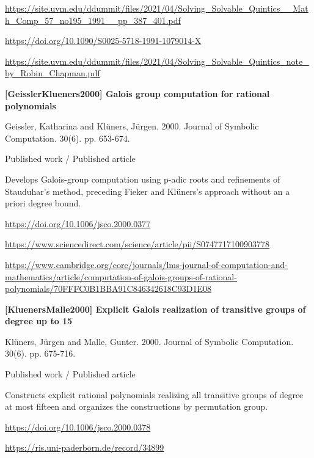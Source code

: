 \documentclass[11pt,a4paper,oneside,openany]{book}
\begin{document}
{\footnotesize\url{https://site.uvm.edu/ddummit/files/2021/04/Solving_Solvable_Quintics__Math_Comp_57_no195_1991__pp_387_401.pdf}}\par
{\footnotesize\url{https://doi.org/10.1090/S0025-5718-1991-1079014-X}}\par
{\footnotesize\url{https://site.uvm.edu/ddummit/files/2021/04/Solving_Solvable_Quintics_note_by_Robin_Chapman.pdf}}\par
\vspace{9pt}
\hypertarget{ref:GeisslerKlueners2000}{}
{\sffamily\bfseries\color{atlasgreen}[GeisslerKlueners2000] Galois group computation for rational polynomials}\par
\color{black} Geissler, Katharina and Klüners, Jürgen. 2000. Journal of Symbolic Computation. 30(6). pp. 653-674.\par
{\small\sffamily\color{atlasgold}Published work / Published article}\par
\color{black} Develops Galois-group computation using p-adic roots and refinements of Stauduhar's method, preceding Fieker and Klüners's approach without an a priori degree bound.\par
{\footnotesize\url{https://doi.org/10.1006/jsco.2000.0377}}\par
{\footnotesize\url{https://www.sciencedirect.com/science/article/pii/S0747717100903778}}\par
{\footnotesize\url{https://www.cambridge.org/core/journals/lms-journal-of-computation-and-mathematics/article/computation-of-galois-groups-of-rational-polynomials/70FFFC0B1BBA91C846342618C93D1E08}}\par
\vspace{9pt}
\hypertarget{ref:KluenersMalle2000}{}
{\sffamily\bfseries\color{atlasgreen}[KluenersMalle2000] Explicit Galois realization of transitive groups of degree up to 15}\par
\color{black} Klüners, Jürgen and Malle, Gunter. 2000. Journal of Symbolic Computation. 30(6). pp. 675-716.\par
{\small\sffamily\color{atlasgold}Published work / Published article}\par
\color{black} Constructs explicit rational polynomials realizing all transitive groups of degree at most fifteen and organizes the constructions by permutation group.\par
{\footnotesize\url{https://doi.org/10.1006/jsco.2000.0378}}\par
{\footnotesize\url{https://ris.uni-paderborn.de/record/34899}}\par
\end{document}
